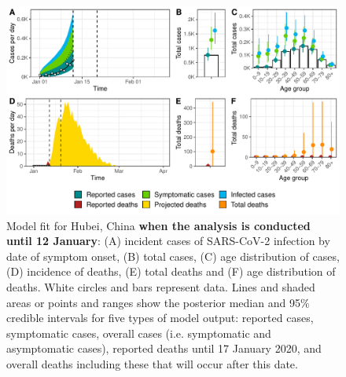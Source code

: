 \documentclass{article}
\begin{document}
\begin{figure}[H]
	\includegraphics[width=\linewidth]{../format_output/figures_v3/supp_fit_16F12.pdf}
	\caption{Model fit for Hubei, China \textbf{when the analysis is conducted until 12 January}: (A) incident cases of SARS-CoV-2 infection by date of symptom onset, (B) total cases, (C) age distribution of cases, (D) incidence of deaths, (E) total deaths and (F) age distribution of deaths. White circles and bars represent data. Lines and shaded areas or points and ranges show the posterior median and 95\% credible intervals for five types of model output: reported cases, symptomatic cases, overall cases (i.e. symptomatic and asymptomatic cases), reported deaths until 17 January 2020, and overall deaths including these that will occur after this date.}
	\label{fig:timesst1}
\end{figure}
\end{document}
